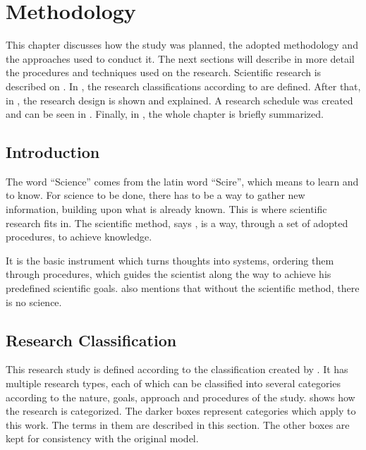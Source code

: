 \chapter{Methodology}\label{methodology}

This chapter discusses how the study was planned, the adopted methodology and the approaches used to conduct it. The next sections will describe in more detail the procedures and techniques used on the research. Scientific research is described on . In , the research classifications according to \textcite{Prodanov:2013} are defined. After that, in , the research design is shown and explained. A research schedule was created and can be seen in . Finally, in , the whole chapter is briefly summarized.

\section{Introduction}\label{sec:met-1}

The word ``Science'' comes from the latin word ``Scire'', which means to learn and to know. For science to be done, there has to be a way to gather new information, building upon what is already known. This is where scientific research fits in. The scientific method, says \textcite{Prodanov:2013}, is a way, through a set of adopted procedures, to achieve knowledge.

It is the basic instrument which turns thoughts into systems, ordering them through procedures, which guides the scientist along the way to achieve his predefined scientific goals. \textcite{Prodanov:2013} also mentions that without the scientific method, there is no science.

\section{Research Classification}\label{sec:met-2}

This research study is defined according to the classification created by \textcite{Prodanov:2013}. It has multiple research types, each of which can be classified into several categories according to the nature, goals, approach and procedures of the study.  shows how the research is categorized. The darker boxes represent categories which apply to this work. The terms in them are described in this section. The other boxes are kept for consistency with the original model.


